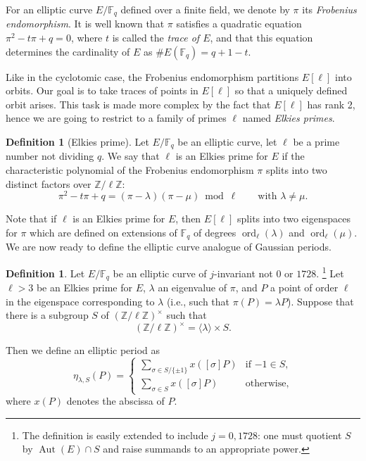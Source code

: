 \documentclass{mcom-l}
\theoremstyle{plain}
\theoremstyle{definition}
\newtheorem{definition}[theorem]{Definition}
\DeclareMathOperator{\order}{ord} %
\DeclareMathOperator{\Aut}{Aut}
\newcommand{\Z}{\ensuremath{\mathbb{Z}}}
\newcommand{\F}{\ensuremath{\mathbb{F}}}
\begin{document}
For an elliptic curve $E/\F_q$ defined over a finite field, we denote
by $\pi$ its \emph{Frobenius endomorphism}. It is well known that
$\pi$ satisfies a quadratic equation $\pi^2-t\pi+q=0$, where $t$ is
called the \emph{trace of $E$}, and that this equation determines the
cardinality of $E$ as $\#E(\F_q)=q+1-t$.

Like in the cyclotomic case, the Frobenius endomorphism partitions
$E[\ell]$ into orbits. Our goal is to take traces of points in
$E[\ell]$ so that a uniquely defined orbit arises. This task is made
more complex by the fact that $E[\ell]$ has rank 2, hence we are going
to restrict to a family of primes $\ell$ named \emph{Elkies primes}.

\begin{definition}[Elkies prime]
  Let $E/\F_q$ be an elliptic curve, let $\ell$ be a prime number not
  dividing $q$.  We say that $\ell$ is an Elkies prime for $E$ if the
  characteristic polynomial of the Frobenius endomorphism $\pi$ splits
  into two distinct factors over $\Z/\ell\Z$:
\begin{equation}
\pi^2-t\pi+q=(\pi-\lambda)(\pi-\mu)\bmod\ell
\qquad\text{with $\lambda\ne\mu$}.
\end{equation}
\end{definition}

Note that if $\ell$ is an Elkies prime for $E$, then $E[\ell]$ splits
into two eigenspaces for $\pi$ which are defined on extensions of
$\F_q$ of degrees $\order_\ell(\lambda)$ and $\order_\ell(\mu)$. We
are now ready to define the elliptic curve analogue of Gaussian
periods.

\begin{definition}
  \label{definition:ellperiod}
  Let $E/\F_q$ be an elliptic curve of $j$-invariant not $0$ or
  $1728$.%
  \footnote{The definition is easily extended to include $j=0,1728$:
    one must quotient $S$ by $\Aut(E)\cap S$ and raise summands to an
    appropriate power.} %
  Let $\ell > 3$ be an Elkies prime for $E$, $\lambda$ an eigenvalue
  of $\pi$, and $P$ a point of order $\ell$ in the eigenspace
  corresponding to $\lambda$ (i.e., such that $\pi(P)=\lambda P$).
  Suppose that there is a subgroup $S$ of $(\Z/\ell\Z)^{\times}$ such
  that
  \begin{equation}
    (\Z/\ell\Z)^{\times} = \langle{\lambda}\rangle \times S.
  \end{equation}
  
  Then we define an elliptic period as
  \begin{equation}
    \eta_{\lambda,S}(P) =
    \begin{cases}
      \sum_{\sigma\in S/\{\pm1\}} {x \left([\sigma] P \right)} & \text{if $-1\in S$,}\\
      \sum_{\sigma\in S} {x \left([\sigma] P \right)} & \text{otherwise,}
    \end{cases}
  \end{equation}
  where $x(P)$ denotes the abscissa of $P$.
\end{definition}
\end{document}
